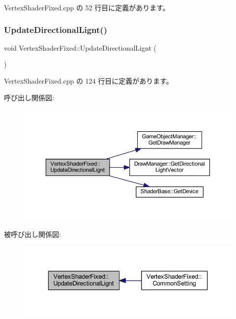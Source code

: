  Vertex\+Shader\+Fixed.\+cpp の 52 行目に定義があります。

\mbox{\label{class_vertex_shader_fixed_ae15e2c1ce81ca57cf657a6edff36cf9c}} 
\subsubsection{\texorpdfstring{Update\+Directional\+Lignt()}{UpdateDirectionalLignt()}}
{\footnotesize\ttfamily void Vertex\+Shader\+Fixed\+::\+Update\+Directional\+Lignt (\begin{DoxyParamCaption}{ }\end{DoxyParamCaption})\hspace{0.3cm}{\ttfamily [private]}}



 Vertex\+Shader\+Fixed.\+cpp の 124 行目に定義があります。

呼び出し関係図\+:\nopagebreak
\begin{figure}[H]
\begin{center}
\leavevmode
\includegraphics[width=350pt]{class_vertex_shader_fixed_ae15e2c1ce81ca57cf657a6edff36cf9c_cgraph}
\end{center}
\end{figure}
被呼び出し関係図\+:\nopagebreak
\begin{figure}[H]
\begin{center}
\leavevmode
\includegraphics[width=336pt]{class_vertex_shader_fixed_ae15e2c1ce81ca57cf657a6edff36cf9c_icgraph}
\end{center}
\end{figure}


